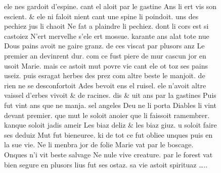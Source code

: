 \documentclass[
  letterpaper,
  DIV=11,
  numbers=noendperiod,
  oneside]{scrreprt}
\begin{document}
\begin{figure}
ele nes gardoit d'espine. cant el aloit par le gastine Ans li ert vis
son escient. \& ele ni faloit nient cant une spine li poindoit. uns des
pechiez jus li chaoit Ne fat a plaindre li pechiez. dont li cors est si
castoiez N'ert mervelhe s'ele ert mossue. karante ans alat tote nue Dous
pains avoit ne gaire granz. de ces viscat par plusors anz Le premier an
devinrent dur. com ce fust piere de mur cascun jor en usoit Marie. mais
ce astoit mut povre vie cant ele ot toz ses pains useiz. puis esragat
herbes des prez com altre beste le manjoit. de rien ne se desconfortoit
Ades bevoit ens el ruisel. ele n'avoit altre vaissel d'erbes vivoit \&
de racines. dis \& uit ans par la gastines Puis fut vint ans que ne
manja. sel angeles Deu ne li porta Diables li vint devant premier. que
mut le soloit anoier que li faissoit ramembrer. kanque soloit jadis
ameir Les biaz deliz \& les biaz giuz. u soloit faire ses deduiz Mut fut
bieneuree. ki de tot ce fut obliee unques puis en la sue vie. Ne li
menbra jor de folie Marie vat par le boscage. Onques n'i vit beste
salvage Ne nule vive creature. par le forest vat bien segure en plusors
lius fut ses ostaz. sa vie astoit spirituaz \ldots..


\end{figure}
\end{document}
